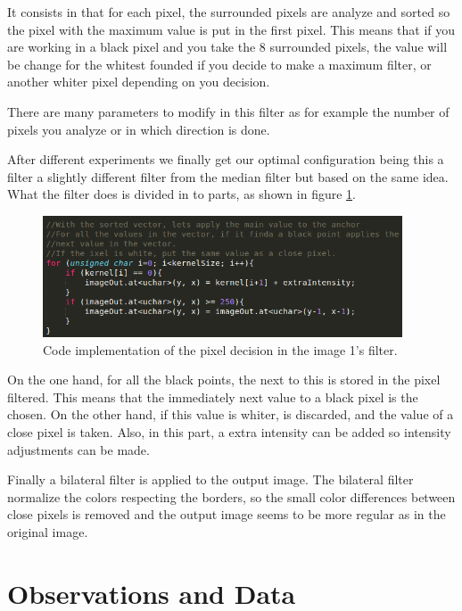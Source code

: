It consists in that for each pixel, the surrounded pixels are analyze and sorted so the pixel with the maximum value is put in the first pixel. This means that if you are working in a black pixel and you take the 8 surrounded pixels, the value will be change for the whitest founded if you decide to make a maximum filter, or another whiter pixel depending on you decision.

There are many parameters to modify in this filter as for example the number of pixels you analyze or in which direction is done.

After different experiments we finally get our optimal configuration being this a filter a slightly different filter from the median filter but based on the same idea. What the filter does is divided in to parts, as shown in figure \ref{fig:1-filterCode}.

\begin{figure}[!ht]
	\centering
	\includegraphics[width=0.95\textwidth]{figures/1-filterCode}
	\caption{Code implementation of the pixel decision in the image 1's filter.}
	\label{fig:1-filterCode}
\end{figure}

On the one hand, for all the black points, the next to this is stored in the pixel filtered. This means that the immediately next value to a black pixel is the chosen. On the other hand, if this value is whiter, is discarded, and the value of a close pixel is taken. Also, in this part, a extra intensity can be added so intensity adjustments can be made.

Finally a bilateral filter is applied to the output image. The bilateral filter \cite{bilateralFilter} normalize the colors respecting the borders, so the small color differences between close pixels is removed and the output image seems to be more regular as in the original image.

\section{Observations and Data}
\label{sec:image1_observations}


